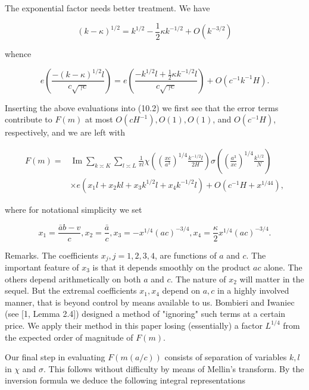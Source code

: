 \documentclass[10pt]{article}
\begin{document}
The exponential factor needs better treatment. We have

$$
(k-\kappa)^{1 / 2}=k^{1 / 2}-\frac{1}{2} \kappa k^{-1 / 2}+O\left(k^{-3 / 2}\right)
$$

whence

$$
e\left(\frac{-(k-\kappa)^{1 / 2} l}{c \sqrt{\gamma c}}\right)=e\left(\frac{-k^{1 / 2} l+\frac{1}{2} \kappa k^{-1 / 2} l}{c \sqrt{\gamma c}}\right)+O\left(c^{-1} k^{-1} H\right) .
$$

Inserting the above evaluations into (10.2) we first see that the error terms contribute to $F(m)$ at most $O\left(c H^{-1}\right), O(1), O(1)$, and $O\left(c^{-1} H\right)$, respectively, and we are left with


\begin{align*}
F(m)= & \operatorname{Im}\sum_{k\asymp K}\sum_{l\asymp L} \frac{1}{\pi l} \chi\left(\left(\frac{x c}{a^{3}}\right)^{1 / 4} \frac{k^{-1 / 2} l}{2 H}\right) \sigma\left(\left(\frac{a^{3}}{x c}\right)^{1 / 4} \frac{k^{1 / 2}}{N}\right) \\
& \times e\left(x_{1} l+x_{2} k l+x_{3} k^{1 / 2} l+x_{4} k^{-1 / 2} l\right)+O\left(c^{-1} H+x^{1 / 44}\right), \tag{12.1}
\end{align*}


where for notational simplicity we set


\begin{equation*}
x_{1}=\frac{\bar{a} b-v}{c}, x_{2}=\frac{\bar{a}}{c}, x_{3}=-x^{1 / 4}(a c)^{-3 / 4}, x_{4}=\frac{\kappa}{2} x^{1 / 4}(a c)^{-3 / 4} . \tag{12.2}
\end{equation*}


Remarks. The coefficients $x_{j}, j=1,2,3,4$, are functions of $a$ and $c$. The important feature of $x_{3}$ is that it depends smoothly on the product $a c$ alone. The others depend arithmetically on both $a$ and $c$. The nature of $x_{2}$ will matter in the sequel. But the extremal coefficients $x_{1}, x_{4}$ depend on $a, c$ in a highly involved manner, that is beyond control by means available to us. Bombieri and Iwaniec (see [1, Lemma 2.4]) designed a method of "ignoring" such terms at a certain price. We apply their method in this paper losing (essentially) a factor $L^{1 / 4}$ from the expected order of magnitude of $F(m)$.

Our final step in evaluating $F(m(a / c))$ consists of separation of variables $k, l$ in $\chi$ and $\sigma$. This follows without difficulty by means of Mellin's transform. By the inversion formula we deduce the following integral representations
\end{document}
